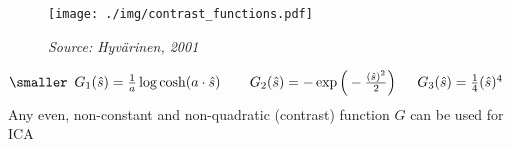 \begin{frame}{\subsubsecname}
 
 \begin{figure}
 	\centering
 	\texttt{[image: ./img/contrast\_functions.pdf]}
    \vspace{-0.5cm}
 	\caption*{\hspace{5cm}\textit{\tiny{Source: Hyv\"arinen, 2001}}}
 \end{figure}
 
 \begin{equation*}
 	\smaller
 \begin{array}{lll}
 	G_1(\hat{s}) = \frac{1}{a} \log \cosh (a \cdot \hat{s}) 
 	\;\;& \;\;G_2(\hat{s}) = -\exp \Big( -\frac{(\hat{s})^2}{2} \Big)
 	& \;\;G_3(\hat{s}) = \frac{1}{4} (\hat{s})^4
	\end{array}
 \end{equation*}
 Any even, non-constant and non-quadratic (contrast) function $G$ can be used for ICA
 
 
 \end{frame}

